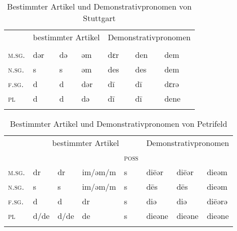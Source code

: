 \begin{table}[H]
	\caption{Bestimmter Artikel und Demonstrativpronomen von Stuttgart \citep[154-155]{Frey1975}}\label{table94}
	\begin{tabular}{lllllll}
		\lsptoprule
		& \multicolumn{3}{c}{bestimmter Artikel} & \multicolumn{3}{c}{Demonstrativpronomen} \\\cmidrule(lr){2-4}\cmidrule(lr){5-7}
		& \NOM & \AKK & \DAT & \NOM & \AKK & \DAT\\\midrule
		\textsc{m.sg.} & dǝr & dǝ & ǝm & dɛr & den & dem\\
		\textsc{n.sg.} & s & s & ǝm & des & des & dem\\
		\textsc{f.sg.} & d & d & dǝr & d\=i & d\=i & dɛrǝ\\
		\textsc{pl} & d & d & də & d\=i & d\=i & dene\\
		\lspbottomrule
	\end{tabular}
\end{table}


\begin{table}[H]
	\caption{Bestimmter Artikel und Demonstrativpronomen von Petrifeld \citep[63-64, 65]{Moser1937}}\label{table95}
	\begin{tabular}{llllllll}
		\lsptoprule
		& \multicolumn{4}{c}{bestimmter Artikel}  & \multicolumn{3}{c}{Demonstrativpronomen} \\\cmidrule(lr){2-5}\cmidrule(lr){6-8}
		& \NOM & \AKK & \DAT & \textsc{poss} & \NOM & \AKK & \DAT\\\midrule
		\textsc{m.sg.} & dr & dr & im/ǝm/m & s & di\=eǝr & di\=eǝr & dieǝm\\
		\textsc{n.sg.} & s & s & im/ǝm/m & s & d\=es & d\=es & dieǝm\\
		\textsc{f.sg.} & d & d & dr & s & diǝ & diǝ & di\=eǝrǝ\\
		\textsc{pl} & d/de & d/de & de & s & dieǝne & dieǝne & dieǝne\\
		\lspbottomrule
	\end{tabular}
\end{table}


